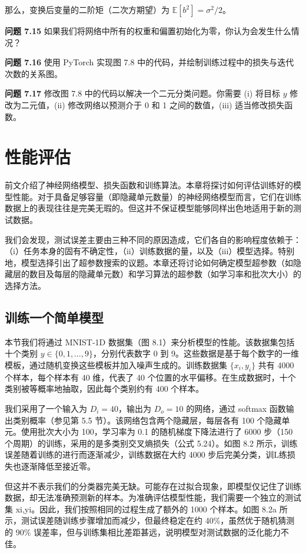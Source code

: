 \documentclass[lang=cn,newtx,10pt,scheme=chinese]{elegantbook}
\begin{document}
那么，变换后变量的二阶矩（二次方期望）为 \(\mathbb{E}[b^2] = \sigma^2/2\)。

\textbf{问题 7.15} 如果我们将网络中所有的权重和偏置初始化为零，你认为会发生什么情况？

\textbf{问题 7.16} 使用 PyTorch 实现图 7.8 中的代码，并绘制训练过程中的损失与迭代次数的关系图。

\textbf{问题 7.17} 修改图 7.8 中的代码以解决一个二元分类问题。你需要 (i) 将目标 \(y\) 修改为二元值，(ii) 修改网络以预测介于 0 和 1 之间的数值，(iii) 适当修改损失函数。

\chapter{性能评估}

前文介绍了神经网络模型、损失函数和训练算法。本章将探讨如何评估训练好的模型性能。对于具备足够容量（即隐藏单元数量）的神经网络模型而言，它们在训练数据上的表现往往是完美无瑕的。但这并不保证模型能够同样出色地适用于新的测试数据。

我们会发现，测试误差主要由三种不同的原因造成，它们各自的影响程度依赖于：（i）任务本身的固有不确定性，（ii）训练数据的量，以及（iii）模型选择。特别地，模型选择引出了超参数搜索的议题。本章还将讨论如何确定模型超参数（如隐藏层的数目及每层的隐藏单元数）和学习算法的超参数（如学习率和批次大小）的选择方法。
\section{训练一个简单模型}
本节我们将通过 MNIST-1D 数据集（图 8.1）来分析模型的性能。该数据集包括十个类别 \(y \in \{0,1,\ldots,9\}\)，分别代表数字 0 到 9。这些数据是基于每个数字的一维模板，通过随机变换这些模板并加入噪声生成的。训练数据集 \(\{x_i, y_i\}\) 共有 4000 个样本，每个样本有 40 维，代表了 40 个位置的水平偏移。在生成数据时，十个类别被等概率地抽取，因此每个类别约有 400 个样本。

我们采用了一个输入为 \(D_i = 40\)，输出为 \(D_o = 10\) 的网络，通过 softmax 函数输出类别概率（参见第 5.5 节）。该网络包含两个隐藏层，每层各有 100 个隐藏单元。使用批次大小为 100，学习率为 0.1 的随机梯度下降法进行了 6000 步（150 个周期）的训练，采用的是多类别交叉熵损失（公式 5.24）。如图 8.2 所示，训练误差随着训练的进行而逐渐减少，训练数据在大约 4000 步后完美分类，训L练损失也逐渐降低至接近零。

但这并不表示我们的分类器完美无缺。可能存在过拟合现象，即模型仅记住了训练数据，却无法准确预测新的样本。为准确评估模型性能，我们需要一个独立的测试集 {xi,yi}。因此，我们按照相同的过程生成了额外的 1000 个样本。如图 8.2a 所示，测试误差随训练步骤增加而减少，但最终稳定在约 40\%，虽然优于随机猜测的 90\% 误差率，但与训练集相比差距甚远，说明模型对测试数据的泛化能力不佳。
\end{document}

